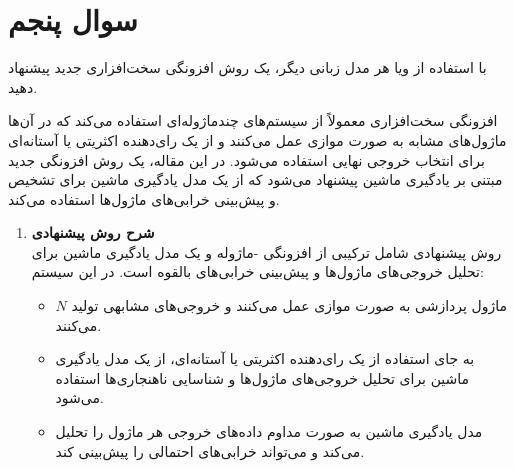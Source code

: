 \section{سوال پنجم}

با استفاده از  ویا هر مدل زبانی دیگر، یک روش افزونگی سخت‌افزاری جدید پیشنهاد دهید.




\begin{qsolve}
	
	
	
	
	افزونگی سخت‌افزاری معمولاً از سیستم‌های چندماژوله‌ای استفاده می‌کند که در آن‌ها ماژول‌های مشابه به صورت موازی عمل می‌کنند و از یک رای‌دهنده اکثریتی یا آستانه‌ای برای انتخاب خروجی نهایی استفاده می‌شود. در این مقاله، یک روش افزونگی جدید مبتنی بر یادگیری ماشین پیشنهاد می‌شود که از یک مدل یادگیری ماشین برای تشخیص و پیش‌بینی خرابی‌های ماژول‌ها استفاده می‌کند.
	
	\begin{enumerate}
		\item 
		\textbf{شرح روش پیشنهادی}\\
		روش پیشنهادی شامل ترکیبی از افزونگی -ماژوله و یک مدل یادگیری ماشین برای تحلیل خروجی‌های ماژول‌ها و پیش‌بینی خرابی‌های بالقوه است. در این سیستم:
		
		\begin{itemize}
			\item $N$ ماژول پردازشی به صورت موازی عمل می‌کنند و خروجی‌های مشابهی تولید می‌کنند.
			\item به جای استفاده از یک رای‌دهنده اکثریتی یا آستانه‌ای، از یک مدل یادگیری ماشین برای تحلیل خروجی‌های ماژول‌ها و شناسایی ناهنجاری‌ها استفاده می‌شود.
			\item مدل یادگیری ماشین به صورت مداوم داده‌های خروجی هر ماژول را تحلیل می‌کند و می‌تواند خرابی‌های احتمالی را پیش‌بینی کند.
		\end{itemize}
	\end{enumerate}
\end{qsolve}


